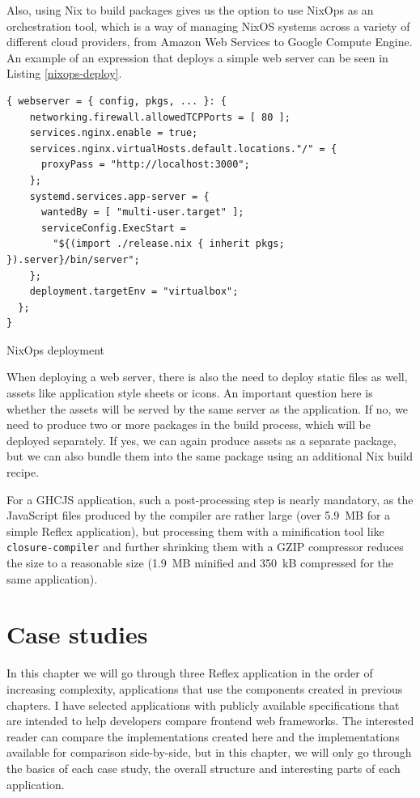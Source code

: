 \documentclass[english,zadani,odsaz]{fitthesis}
\begin{document}
Also, using Nix to build packages gives us the option to use NixOps as an
orchestration tool, which is a way of managing NixOS systems across a variety of
different cloud providers, from Amazon Web Services to Google Compute Engine. An
example of an expression that deploys a simple web server can be seen in Listing
\ref{nixops-deploy}.

\begin{listing}[b]
\begin{verbatim}
{ webserver = { config, pkgs, ... }: {
    networking.firewall.allowedTCPPorts = [ 80 ];
    services.nginx.enable = true;
    services.nginx.virtualHosts.default.locations."/" = {
      proxyPass = "http://localhost:3000";
    };
    systemd.services.app-server = {
      wantedBy = [ "multi-user.target" ];
      serviceConfig.ExecStart =
        "${(import ./release.nix { inherit pkgs; }).server}/bin/server";
    };
    deployment.targetEnv = "virtualbox";
  };
}
\end{verbatim}
\caption{NixOps deployment \label{nixops-deploy}}
\end{listing}

When deploying a web server, there is also the need to deploy static files as
well, assets like application style sheets or icons. An important question here
is whether the assets will be served by the same server as the application. If
no, we need to produce two or more packages in the build process, which will be
deployed separately. If yes, we can again produce assets as a separate package,
but we can also bundle them into the same package using an additional Nix build
recipe.

For a GHCJS application, such a post-processing step is nearly mandatory, as the
JavaScript files produced by the compiler are rather large (over 5.9~MB
for a simple Reflex application), but processing them with a minification tool
like \texttt{closure-compiler} and further shrinking them with a GZIP compressor reduces
the size to a reasonable size (1.9~MB minified and 350~kB compressed
for the same application).

\chapter{Case studies}
\label{sec:org11d8feb}
In this chapter we will go through three Reflex application in the order of
increasing complexity, applications that use the components created in previous
chapters. I have selected applications with publicly available specifications
that are intended to help developers compare frontend web frameworks. The
interested reader can compare the implementations created here and the
implementations available for comparison side-by-side, but in this chapter, we
will only go through the basics of each case study, the overall structure and
interesting parts of each application.
\end{document}
